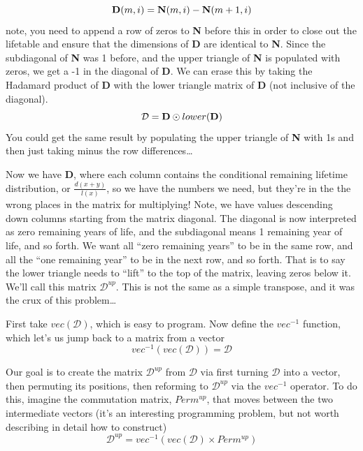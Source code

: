 \documentclass[11pt,oneside,a4paper]{article} %
\begin{document}
\begin{equation}
\text{\textbf{D}}(m, i) = \text{\textbf{N}}(m, i) 
- \text{\textbf{N}}(m+1, i)
\end{equation}
note, you need to append a row of zeros to \textbf{N} before this in order to
close out the lifetable and ensure that the dimensions of \textbf{D} are
identical to \textbf{N}. Since the subdiagonal of \textbf{N} was 1 before, and
the upper triangle of \textbf{N} is populated with zeros, we get a -1 in the
diagonal of \textbf{D}. We can erase this by taking the Hadamard product of
\textbf{D} with the lower triangle matrix of \textbf{D} (not inclusive of the
diagonal).
\begin{equation}
\mathcal{D} = \text{\textbf{D}} \odot lower(\text{\textbf{D}})
\end{equation}
You could get the same result by populating the upper triangle of \textbf{N}
with 1s and then just taking minus the row differences\ldots

Now we have \textbf{D}, where each column contains the conditional remaining
lifetime distribution, or $\frac{d(x+y)}{l(x)}$, so we have the numbers we need,
but they're in the the wrong places in the matrix for multiplying! Note, we have
values descending down columns starting from the matrix diagonal. The diagonal
is now interpreted as zero remaining years of life, and the subdiagonal means 1
remaining year of life, and so forth. We want all ``zero remaining years'' to be
in the same row, and all the ``one remaining year'' to be in the next row, and
so forth. That is to say the lower triangle needs to ``lift'' to the top of the
matrix, leaving zeros below it. We'll call this matrix $\mathcal{D}^{up}$.
This is not the same as a simple transpose, and it was the crux of this problem\ldots

First take $vec(\mathcal{D})$, which is easy to program. Now define the
$vec^{-1}$ function, which let's us jump back to a matrix from a vector
\begin{equation}
vec^{-1}(vec(\mathcal{D})) =\mathcal{D} 
\end{equation}

Our goal is to create the matrix $\mathcal{D}^{up}$ from $\mathcal{D}$ via first
turning  $\mathcal{D}$ into a vector, then permuting its positions, then
reforming to $\mathcal{D}^{up}$ via the $vec^{-1}$ operator. To do this, imagine
the commutation matrix, $Perm^{up}$, that moves between the two
intermediate vectors (it's an interesting programming problem, but not worth
describing in detail how to construct)
\begin{equation}
 \mathcal{D}^{up} = vec^{-1}(vec(\mathcal{D}) \times Perm^{up})
\end{equation}
\end{document}
